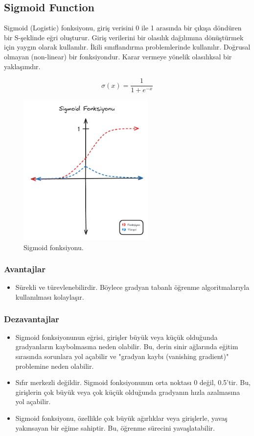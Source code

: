 \newpage

\subsection{Sigmoid Function}
Sigmoid (Logistic) fonksiyonu, giriş verisini 0 ile 1 arasında bir çıkışa döndüren bir S-şeklinde eğri oluşturur. Giriş verilerini bir olasılık dağılımına dönüştürmek için yaygın olarak kullanılır. İkili sınıflandırma problemlerinde kullanılır. Doğrusal olmayan (non-linear) bir fonksiyondur. Karar vermeye yönelik olasılıksal bir yaklaşımdır.

\[\sigma(x) = \frac{1}{1 + e^{-x}}\]

\begin{figure}[h]
    \centering
    \includegraphics[width=0.6\textwidth]{images/sigmoid_function.png}
    \caption{Sigmoid fonksiyonu.}
    \label{fig:enter-label}
\end{figure}

\subsubsection{Avantajlar}
\begin{itemize}
    \item Sürekli ve türevlenebilirdir. Böylece gradyan tabanlı öğrenme algoritmalarıyla kullanılması kolaylaşır.
\end{itemize}

\subsubsection{Dezavantajlar}
\begin{itemize}
    \item Sigmoid fonksiyonunun eğrisi, girişler büyük veya küçük olduğunda gradyanların kaybolmasına neden olabilir. Bu, derin sinir ağlarında eğitim sırasında sorunlara yol açabilir ve "gradyan kaybı (vanishing gradient)" problemine neden olabilir.
    \item Sıfır merkezli değildir. Sigmoid fonksiyonunun orta noktası 0 değil, 0.5'tir. Bu, girişlerin çok büyük veya çok küçük olduğunda gradyanın hızla azalmasına yol açabilir.
    \item Sigmoid fonksiyonu, özellikle çok büyük ağırlıklar veya girişlerle, yavaş yakınsayan bir eğime sahiptir. Bu, öğrenme sürecini yavaşlatabilir.
\end{itemize}


